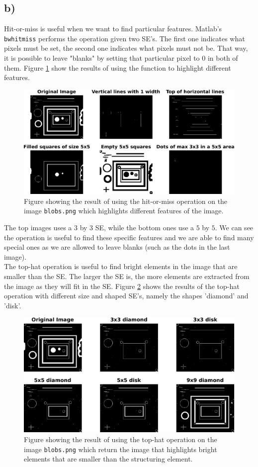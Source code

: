 \documentclass[a4paper]{article}
\begin{document}
\subsection*{b)}
Hit-or-miss is useful when we want to find particular features. Matlab's \texttt{bwhitmiss} performs the operation given two SE's. The first one indicates what pixels must be set, the second one indicates what pixels must not be. That way, it is possible to leave "blanks" by setting that particular pixel to $0$ in both of them. Figure \ref{3a} show the results of using the function to highlight different features.
\begin{figure}[H]
  \centering
  \captionsetup{justification=centering}
  \includegraphics[width=\textwidth]{q3a-crop.pdf}
  \caption{Figure showing the result of using the hit-or-miss operation on the image \texttt{blobs.png} which highlights different features of the image.}
  \label{3a}
\end{figure}
The top images uses a $3$ by $3$ SE, while the bottom ones use a $5$ by $5$. We can see the operation is useful to find these specific features and we are able to find many special ones as we are allowed to leave blanks (such as the dots in the last image). \\
The top-hat operation is useful to find bright elements in the image that are smaller than the SE. The larger the SE is, the more elements are extracted from the image as they will fit in the SE. Figure \ref{3b} shows the results of the top-hat operation with different size and shaped SE's, namely the shapes 'diamond' and 'disk'.
\begin{figure}[H]
  \centering
  \captionsetup{justification=centering}
  \includegraphics[width=\textwidth]{q3b-crop.pdf}
  \caption{Figure showing the result of using the top-hat operation on the image \texttt{blobs.png} which return the image that highlights bright elements that are smaller than the structuring element.}
  \label{3b}
\end{figure}
\end{document}
